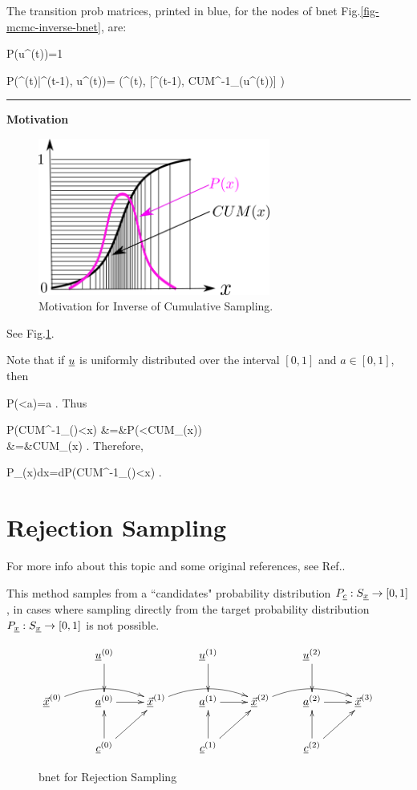The transition prob matrices, printed
in blue, for  the nodes of bnet
 Fig.\ref{fig-mcmc-inverse-bnet}, are:

\beq\color{blue}
P(u^{(t)})=1
\eeq

\beq\color{blue}
P(\vecx^{(t)}|\vecx^{(t-1)}, u^{(t)})=
\delta(\;\;\;\vecx^{(t)},
[\vecx^{(t-1)}, CUM^{-1}_\rvx(u^{(t)})]
\;\;\;)
\eeq

\hrule\noindent
{\bf Motivation}

\begin{figure}[h!]
\centering
\includegraphics[width=3in]
{mcmc/inverse.png}
\caption{Motivation 
for Inverse of Cumulative Sampling.} 
\label{fig-mcmc-inverse}
\end{figure}
See Fig.\ref{fig-mcmc-inverse}.


Note that if 
${\underline{u}}$ is uniformly distributed over 
the interval $[0,1]$ and $a\in[0,1]$, then

\beq
P(\rvu<a)=a
\;.
\eeq
Thus

\beqa
P(CUM^{-1}_\rvx(\rvu)<x)
&=&P(\rvu<CUM_\rvx(x))
\\
&=&CUM_\rvx(x)
\;.
\eeqa
Therefore,

\beq
P_\rvx(x)dx=dP(CUM^{-1}_\rvx(\rvu)<x)
\;.
\eeq


\section*{Rejection Sampling}

For more info about this topic 
and some original references, 
see Ref.\cite{wiki-reject}.

This method samples
from a ``candidates" probability distribution
$P_{\underline{c}}:S_{\underline{x}}\rightarrow [0,1]$,
in cases where sampling directly
from the
target probability distribution
$P_{\underline{x}}:S_{\underline{x}}\rightarrow [0,1]$
is not possible.


\begin{figure}[h!]
$$\xymatrix{
&\rvu^{(0)}\ar[d]
&&\rvu^{(1)}\ar[d]
&&\rvu^{(2)}\ar[d]
\\
\ul{\vecx}^{(0)}\ar@/^1pc/[rr]
&\rva^{(0)}\ar[r]
&
\ul{\vecx}^{(1)}\ar@/^1pc/[rr]
&\rva^{(1)}\ar[r]
&
\ul{\vecx}^{(2)}\ar@/^1pc/[rr]
&\rva^{(2)}\ar[r]
&\ul{\vecx}^{(3)}
\\
&\rvc^{(0)}\ar[u]\ar[ru]
&&\rvc^{(1)}\ar[u]\ar[ru]
&&\rvc^{(2)}\ar[u]\ar[ru]
}$$
\caption{bnet for Rejection Sampling}
\label{fig-mcmc-reject-bnet}
\end{figure}

